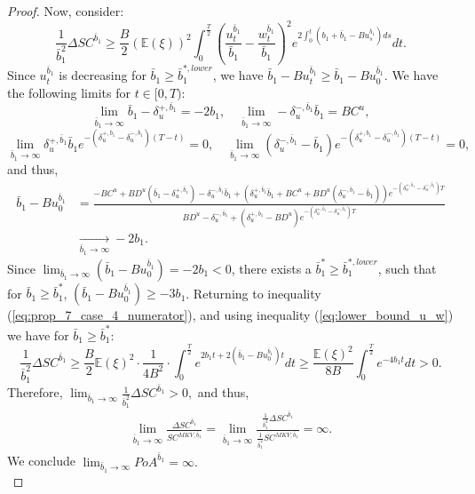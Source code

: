 \documentclass[11pt]{article}
\begin{document}
\begin{proof}
	Now, consider:
	\begin{equation}
	\frac{1}{\bar{b}_1^2}\Delta SC^{\bar{b}_1}\geq \frac{B}{2}(\mathbb{E}(\xi))^2\int_{0}^{\frac{T}{2}} \left(\frac{u_t^{\bar{b}_1}}{\bar{b}_1} - \frac{w_t^{\bar{b}_1}}{\bar{b}_1}\right)^2 e^{2\int_0^t (b_1+\bar{b}_1-B u_s^{\bar{b}_1})ds} dt.
	\label{eq:prop_7_case_4_numerator}
	\end{equation}
	Since $u^{\bar{b}_1}_t$ is decreasing for $\bar{b}_1 \geq \bar{b}_1^{*,lower}$, we have $\bar{b}_1-B u_t^{\bar{b}_1} \geq \bar{b}_1-B u_0^{\bar{b}_1}$. We have the following limits for $t\in[0,T)$:
	\begin{equation*}
	\lim_{\bar{b}_1 \to \infty}\bar{b}_1-\delta^{+,\bar{b}_1}_u=-2b_1, \quad \lim_{\bar{b}_1 \to \infty}-\delta^{-,\bar{b}_1}_u\bar{b}_1=BC^u,
	\end{equation*}
	\begin{equation*}
	\lim_{\bar{b}_1 \to \infty}\delta^{+,\bar{b}_1}_u\bar{b}_1e^{-(\delta^{+,\bar{b}_1}_u-\delta^{-,\bar{b}_1}_u)(T-t)}=0, \quad \lim_{\bar{b}_1 \to \infty}(\delta^{-,\bar{b}_1}_u-\bar{b}_1)e^{-(\delta^{+,\bar{b}_1}_u-\delta^{-,\bar{b}_1}_u)(T-t)}=0,
	\end{equation*}
	and thus,
	\begin{equation*}
	\begin{split}
	\bar{b}_1-Bu^{\bar{b}_1}_0&=\frac{-BC^u+BD^u(\bar{b}_1-\delta^{+,\bar{b}_1}_u)-\delta^{-,\bar{b}_1}_u\bar{b}_1+(\delta^{+,\bar{b}_1}_u\bar{b}_1+BC^u+BD^u(\delta^{-,\bar{b}_1}_u-\bar{b}_1))e^{-(\delta^{+,\bar{b}_1}_u-\delta^{-,\bar{b}_1}_u)T}}{BD^u-\delta^{-,\bar{b}_1}_u+(\delta^{+,\bar{b}_1}_u-BD^u) e^{-(\delta^{+,\bar{b}_1}_u-\delta^{-,\bar{b}_1}_u)T}} \\
	&\xrightarrow[\bar{b}_1 \to \infty]{} -2b_1 .
	\end{split}
	\end{equation*}
	Since $\lim_{\bar{b}_1 \to \infty}(\bar{b}_1-B u_0^{\bar{b}_1}) = -2b_1 < 0$, there exists a $\bar{b}_1^{*}\geq\bar{b}_1^{*,lower}$, such that for $\bar{b}_1 \geq \bar{b}_1^{*}$, $(\bar{b}_1-B u_0^{\bar{b}_1}) \geq -3b_1$. Returning to inequality (\ref{eq:prop_7_case_4_numerator}), and using inequality (\ref{eq:lower_bound_u_w}) we have for $\bar{b}_1 \geq \bar{b}^*_1$:
	\begin{equation*}
	\frac{1}{\bar{b}_1^2}\Delta SC^{\bar{b}_1}
	\geq \frac{B}{2}\mathbb{E}(\xi)^2 \cdot \frac{1}{4B^2} \cdot \int_{0}^{\frac{T}{2}} e^{2b_1 t + 2(\bar{b}_1 - B u_0^{\bar{b}_1}) t } dt \geq \frac{\mathbb{E}(\xi)^2}{8 B} \int_0^{\frac{T}{2}} e^{-4b_1 t} dt  > 0.
	\end{equation*}
	Therefore,
	$
	\lim_{\bar{b}_1 \to \infty}\frac{1}{\bar{b}_1^2}\Delta SC^{\bar{b}_1}>0,
	$
	and thus,
	\begin{equation*}
	\begin{split}
	\lim_{\bar{b}_1 \to \infty}\frac{\Delta SC^{\bar{b}_1}}{SC^{MKV,\bar{b}_1}}=\lim_{\bar{b}_1 \to \infty}\frac{\frac{1}{\bar{b}_1^2}\Delta SC^{\bar{b}_1}}{\frac{1}{\bar{b}_1^2}SC^{MKV,\bar{b}_1}}=\infty.
	\end{split}
	\end{equation*}
	We conclude $\lim_{\bar{b}_1 \to \infty} PoA^{\bar{b}_1}=\infty.$\\


\end{proof}
\end{document}
